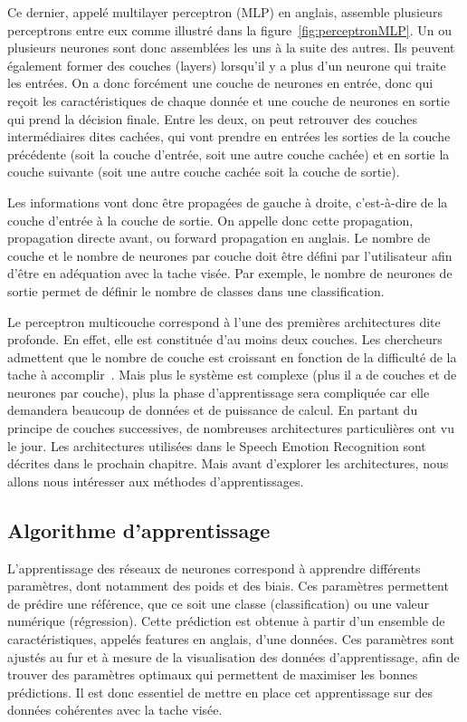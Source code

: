 
Ce dernier, appelé multilayer perceptron (MLP) en anglais, assemble plusieurs perceptrons entre eux comme illustré dans la figure~\ref{fig:perceptronMLP}. Un ou plusieurs neurones sont donc assemblées les uns à la suite des autres. Ils peuvent également former des couches (layers) lorsqu'il y a plus d'un neurone qui traite les entrées. On a donc forcément une couche de neurones en entrée, donc qui reçoit les caractéristiques de chaque donnée et une couche de neurones en sortie qui prend la décision finale. Entre les deux, on peut retrouver des couches intermédiaires dites cachées, qui vont prendre en entrées les sorties de la couche précédente (soit la couche d'entrée, soit une autre couche cachée) et en sortie la couche suivante (soit une autre couche cachée soit la couche de sortie).

Les informations vont donc être propagées de gauche à droite, c'est-à-dire de la couche d'entrée à la couche de sortie. On appelle donc cette propagation, propagation directe avant, ou forward propagation en anglais. Le nombre de couche et le nombre de neurones par couche doit être défini par l'utilisateur afin d'être en adéquation avec la tache visée. Par exemple, le nombre de neurones de sortie permet de définir le nombre de classes dans une classification.

Le perceptron multicouche correspond à l'une des premières architectures dite profonde. En effet, elle est constituée d'au moins deux couches. Les chercheurs admettent que le nombre de couche est croissant en fonction de la difficulté de la tache à accomplir~\cite{Goodfellow2016}. Mais plus le système est complexe (plus il a de couches et de neurones par couche), plus la phase d'apprentissage sera compliquée car elle demandera beaucoup de données et de puissance de calcul.
En partant du principe de couches successives, de nombreuses architectures particulières ont vu le jour. Les architectures utilisées dans le Speech Emotion Recognition sont décrites dans le prochain chapitre. Mais avant d'explorer les architectures, nous allons nous intéresser aux méthodes d'apprentissages.

\subsection{Algorithme d'apprentissage}
L'apprentissage des réseaux de neurones correspond à apprendre différents paramètres, dont notamment des poids et des biais. Ces paramètres permettent de prédire une référence, que ce soit une classe (classification) ou une valeur numérique (régression). Cette prédiction est obtenue à partir d'un ensemble de caractéristiques, appelés features en anglais, d'une données. Ces paramètres sont ajustés au fur et à mesure de la visualisation des données d'apprentissage, afin de trouver des paramètres optimaux qui permettent de maximiser les bonnes prédictions. Il est donc essentiel de mettre en place cet apprentissage sur des données cohérentes avec la tache visée.

